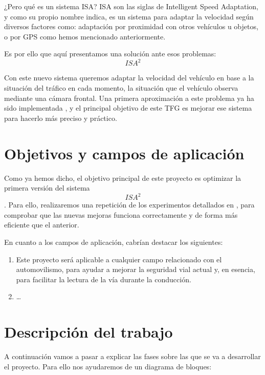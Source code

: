 \documentclass[12pt,oneside,a4paper]{article}
\begin{document}
¿Pero qué es un sistema ISA? ISA son las siglas de Intelligent Speed Adaptation, y como su propio nombre indica, es un sistema para adaptar la velocidad según diversos factores como: adaptación por proximidad con otros vehículos u objetos, o por GPS como hemos mencionado anteriormente.

Es por ello que aquí presentamos una solución ante esos problemas: \[ISA^{2}\]

Con este nuevo sistema queremos adaptar la velocidad del vehículo en base a la situación del tráfico en cada momento, la situación que el vehículo observa mediante una cámara frontal. Una primera aproximación a este problema ya ha sido implementada \cite{isa2}, y el principal objetivo de este TFG es mejorar ese sistema para hacerlo más preciso y práctico.


\section{Objetivos y campos de aplicación}

Como ya hemos dicho, el objetivo principal de este proyecto es optimizar la primera versión del sistema \[ISA^{2}\] \cite{isa2}. Para ello, realizaremos una repetición de los experimentos detallados en \cite{isa2}, para comprobar que las nuevas mejoras funciona correctamente y de forma más eficiente que el anterior.

En cuanto a los campos de aplicación, cabrían destacar los siguientes:
\begin{enumerate}
 \item Este proyecto será aplicable a cualquier campo relacionado con el automovilismo, para ayudar a mejorar la seguridad vial actual y, en esencia, para facilitar la lectura de la vía durante la conducción.
 \item \dots %

\end{enumerate}



\section{Descripción del trabajo}

A continuación vamos a pasar a explicar las fases sobre las que se va a desarrollar el proyecto. Para ello nos ayudaremos de un diagrama de bloques:

\end{document}
